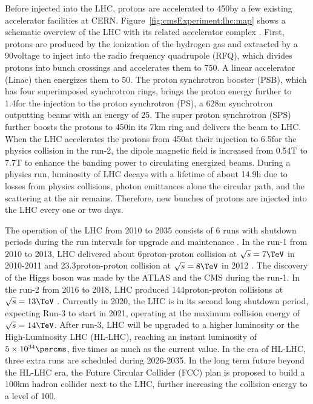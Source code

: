 Before injected into the LHC, protons are accelerated to 450\GeV by a few existing accelerator facilities at CERN. Figure~\ref{fig:cmsExperiment:lhc:map} shows a schematic overview of the LHC with its related accelerator complex  \cite{exhep:lhcInject:Benedikt:2004wm}. First, protons are produced by the ionization of the hydrogen gas and extracted by a 90\keV voltage to inject into the radio frequency quadrupole (RFQ), which divides protons into bunch crossings and accelerates them to 750\keV. A linear accelerator (Linac) then energizes them to 50\MeV. The proton synchrotron booster (PSB), which has four superimposed synchrotron rings, brings the proton energy further to 1.4\GeV for the injection to the proton synchrotron (PS), a 628\unit{m} synchrotron outputting beams with an energy of 25\GeV. The super proton synchrotron (SPS) further boosts the protons to 450\GeV in its 7\unit{km} ring and delivers the beam to LHC. When the LHC accelerates the protons from 450\GeV at their injection to 6.5\TeV for the physics collision in the run-2, the dipole magnetic field is increased from 0.54\unit{T} to 7.7\unit{T} to enhance the banding power to circulating energized beams. During a physics run, luminosity of LHC decays with a lifetime of about 14.9\unit{h} \cite{exhep:lhc:Evans:2008zzb} due to losses from physics collisions, photon emittances alone the circular path, and the scattering at the air remains. Therefore, new bunches of protons are injected into the LHC every one or two days.



The operation of the LHC from 2010 to 2035 consists of 6 runs with shutdown periods during the run intervals for upgrade and maintenance . In the run-1 from 2010 to 2013, LHC delivered about 6\fbinv proton-proton collision at $\sqrt{s}=7\TeV$ in 2010-2011 and 23.3\fbinv proton-proton collision at $\sqrt{s}=8\TeV$ in 2012 \cite{cms:publicLumiInfo}. The discovery of the Higgs boson was made by the ATLAS \cite{exhep:atlasHiggsDisc:Aad:2012tfa} and the CMS \cite{exhep:cmsHiggsDisc:Chatrchyan:2012ufa} during the run-1. In the run-2 from 2016 to 2018, LHC produced 144\fbinv proton-proton collisions at $\sqrt{s}=13\TeV$ \cite{cms:publicLumiInfo}. Currently in 2020, the LHC is in its second long shutdown period, expecting Run-3 to start in 2021, operating at the maximum collision energy of $\sqrt{s}=14\TeV$. After run-3, LHC will be upgraded to a higher luminosity or the High-Luminosity LHC (HL-LHC), reaching an instant luminosity of $5 \times 10^{34}\percms$, five times as much as the current value. In the era of HL-LHC, three extra runs are scheduled during 2026-2035. In the long term future beyond the HL-LHC era, the Future Circular Collider (FCC) \cite{exhep:fcc:Benedikt:2715354} plan is proposed to build a 100km hadron collider next to the LHC, further increasing the collision energy to a level of 100\TeV.